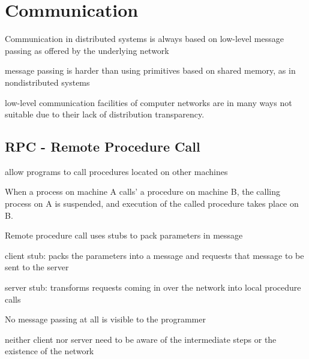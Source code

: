 \documentclass[ngerman,a4paper]{report}
\begin{document}
%
%
\chapter{Communication}

\begin{compactitem}
	\item Communication in distributed systems is always based on low-level message passing as offered by the underlying network
	\item message passing is harder than using primitives based on shared memory, as in nondistributed systems
	\item low-level communication facilities of computer networks are in many ways not suitable due to their lack of distribution transparency.
\end{compactitem}

\section{RPC - Remote Procedure Call}

\begin{compactitem}
	\item allow programs to call procedures located on other machines
	\item When a process on machine A calls' a procedure on machine B, the calling process on A is suspended, and execution of the called procedure takes place on B.
	\item Remote procedure call uses stubs to pack parameters in message
	\item client stub: packs the parameters into a message and requests that message to be sent to the server
	\item server stub: transforms requests coming in over the network into local procedure calls
	\item No message passing at all is visible to the programmer
	\item neither client nor server need to be aware of the intermediate steps or the existence of the network
\end{compactitem}
\end{document}
